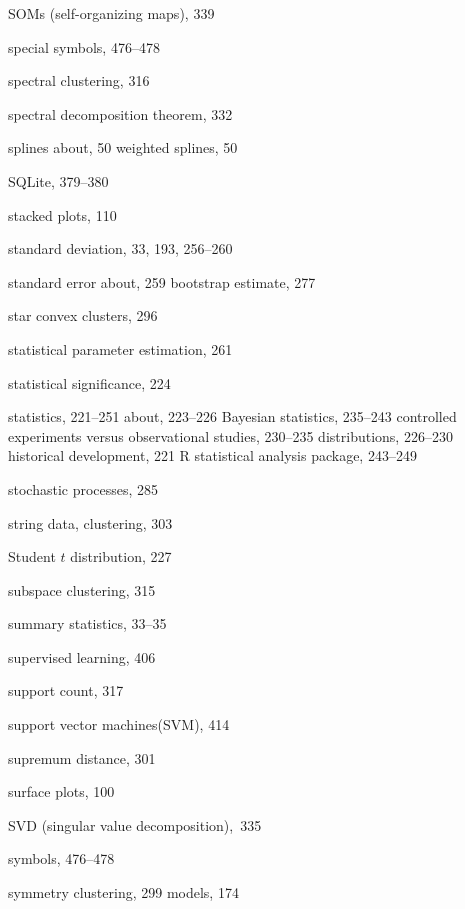 \documentclass{Oreilly5980006}
\begin{document}
\begin{theindex}
  \item SOMs (self-organizing maps), 339
  \item special symbols, 476--478
  \item spectral clustering, 316
  \item spectral decomposition theorem, 332
  \item splines
    \subitem about, 50
    \subitem weighted splines, 50
  \item SQLite, 379--380
  \item stacked plots, 110
  \item standard deviation, 33, 193, 256--260
  \item standard error
    \subitem about, 259
    \subitem bootstrap estimate, 277
  \item star convex clusters, 296
  \item statistical parameter estimation, 261
  \item statistical significance, 224
  \item statistics, 221--251
    \subitem about, 223--226
    \subitem Bayesian statistics, 235--243
    \subitem controlled experiments versus observational studies, 
		230--235
    \subitem distributions, 226--230
    \subitem historical development, 221
    \subitem R statistical analysis package, 243--249
  \item stochastic processes, 285
  \item string data, clustering, 303
  \item Student $t$ distribution, 227
  \item subspace clustering, 315
  \item summary statistics, 33--35
  \item supervised learning, 406
  \item support count, 317
  \item support vector machines\break  (SVM), 414
  \item supremum distance, 301
  \item surface plots, 100
  \item SVD (singular value decomposition),~335
  \item symbols, 476--478
  \item symmetry
    \subitem clustering, 299
    \subitem models, 174

  \indexspace


\end{theindex}
\end{document}

